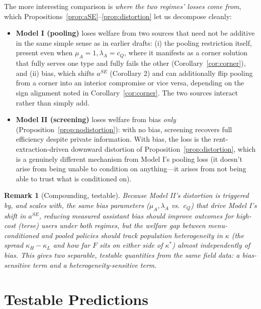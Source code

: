 \documentclass[11pt]{article}
\newtheorem{remark}{Remark}
\begin{document}
The more interesting comparison is \emph{where the two regimes' losses come from},
which Propositions~\ref{prop:aSE}--\ref{prop:distortion} let us decompose cleanly:

\begin{itemize}[leftmargin=*]
\item \textbf{Model I (pooling)} loses welfare from two sources that need not be
additive in the same simple sense as in earlier drafts: (i) the pooling
restriction itself, present even when $\mu_A{=}1,\lambda_A{=}c_Q$, where it
manifests as a corner solution that fully serves one type and fully fails the
other (Corollary~\ref{cor:corner}), and (ii) bias, which shifts $a^{SE}$
(Corollary 2) and can additionally flip pooling from a corner into an interior
compromise or vice versa, depending on the sign alignment noted in
Corollary~\ref{cor:corner}. The two sources interact rather than simply add.
\item \textbf{Model II (screening)} loses welfare from bias \emph{only}
(Proposition~\ref{prop:nodistortion}): with no bias, screening recovers full
efficiency despite private information. With bias, the loss is the
rent-extraction-driven downward distortion of Proposition~\ref{prop:distortion},
which is a genuinely different mechanism from Model I's pooling loss (it doesn't
arise from being unable to condition on anything---it arises from not being able
to trust what is conditioned on).
\end{itemize}

\begin{remark}[Compounding, testable]
Because Model II's distortion is triggered by, and scales with, the same bias
parameters ($\mu_A,\lambda_A$ vs.\ $c_Q$) that drive Model I's shift in
$a^{SE}$, reducing measured assistant bias should improve outcomes for high-cost
(terse) users under \emph{both} regimes, but the welfare \emph{gap between}
menu-conditioned and pooled policies should track population heterogeneity in
$\kappa$ (the spread $\kappa_H-\kappa_L$ and how far $F$ sits on either side of
$\kappa^*$) almost independently of bias. This gives two separable, testable
quantities from the same field data: a bias-sensitive term and a
heterogeneity-sensitive term.
\end{remark}

\section{Testable Predictions}
\label{sec:predictions}
\end{document}
